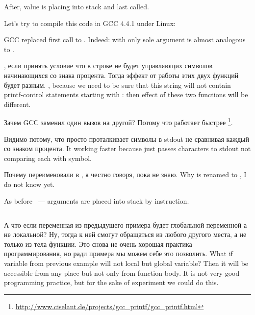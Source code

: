 {After, \ECX value is placing into stack and last \printf called.}

{Let's try to compile this code in GCC 4.4.1 under Linux:}



\label{puts}
{GCC replaced first \printf call to . 
Indeed: \printf with only sole argument is almost analogous to .} 

\IFRU
{, если принять условие что в строке не будет управляющих символов \printf 
начинающихся со знака процента. Тогда эффект от работы этих двух функций будет разным.}
{, because we need to be sure that this string will not contain printf-control 
statements starting with \IT{\%}: then effect of these two functions will be different.}

{Зачем GCC заменил один вызов на другой? Потому что  работает быстрее}
\footnote{\url{http://www.ciselant.de/projects/gcc_printf/gcc_printf.html}}. 

\IFRU
{Видимо потому, что просто проталкивает символы в stdout не сравнивая каждый со знаком процента.}
{It working faster because just passes characters to stdout not comparing each with \IT{\%} symbol.}

\IFRU
{Почему \scanf переименовали в , я честно говоря, пока не знаю.}
{Why \scanf is renamed to , I do not know yet.}

{As before ~--- arguments are placed into stack by \MOV instruction.}

\subsection{}

\IFRU
{А что если переменная  из предыдущего примера будет глобальной переменной а не локальной? 
Ну, тогда к ней смогут обращаться из любого другого места, а не только из тела функции. 
Это снова не очень хорошая практика программирования, но ради примера мы можем себе это позволить.}
{What if  variable from previous example will not local but global variable? 
Then it will be accessible from any place but not only from function body. 
It is not very good programming practice, but for the sake of experiment we could do this.}

